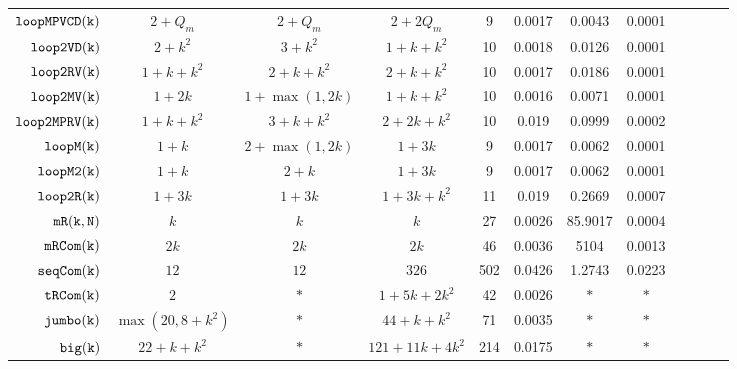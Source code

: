 {\begin {table}[t]
\begin{center}
{\begin{tabular}{| >{\tiny}r | c | c | c | c | c | c | c | c | c | c | c }
         $ {\mathtt{loopMPVCD(k)}}$ & $2+Q_m$ &  $2 + Q_m$  & $2+2Q_m$   &   9 & 0.0017 & 0.0043  & 0.0001 \\
         $  \mathtt{loop2VD(k)}$ & $2 + k^2$ &   $3 + k^2$ & $1 + k + k^2 $   &  10 & 0.0018 & 0.0126  & 0.0001  \\
         $  \mathtt{loop2RV(k)}$ & $1 + k +  k^2$ &  
         $ 2 + k +  k^2 $ 
         &  $2 + k + k^2$   &  10 & 0.0017 & 0.0186  & 0.0001  \\
         $  \mathtt{loop2MV(k)}$ & $1 + 2k $ & $1 + \max(1,2k) $ &  $1 + k + k^2 $  & 10 & 0.0016 & 0.0071  & 0.0001 \\
         $ \mathtt{loop2MPRV(k)}$ & $1 + k + k^2$ &  $3 + k + k^2  $ &  $2 + 2k + k^2  $  &  10 & 0.019 & 0.0999  & 0.0002 \\
         {$ \mathtt{loopM(k)}$} & $1 + k$ &  $ 2 + \max(1,2k) $ & $1 + 3k  $  &  9 & 0.0017 & 0.0062  & 0.0001  \\
         {$ \mathtt{loopM2(k)}$} & $1 + k$ &  $ 2 + k $ & $1 + 3k  $  &  9 & 0.0017 & 0.0062  & 0.0001  \\
         {$\mathtt{loop2R(k)}$} & $1 + 3k$ &  $1 + 3k $ &  $1 + 3k  + k^2$  &  11 & 0.019 & 0.2669  & 0.0007 \\
         $  \mathtt{mR(k, N)}$ & $k$ & $ k   $ & $k $   &  27 & 0.0026 & 85.9017  & 0.0004 \\
         $  \mathtt{mRCom(k)}$ & $2k$ & $  2k $ & $ 2k $   &  46 & 0.0036 & 5104  &  0.0013\\
         $  \mathtt{seqCom(k)}$ & $12$ & $12  $  & $326 $  &  502 & 0.0426  & 1.2743  & 0.0223 \\
         $  \mathtt{tRCom(k)}$ & $2$ &  $ * $ &  $ 1 + 5k + 2 k^2$  &  42 & 0.0026 & $*$  & $*$\\
         $  \mathtt{{jumbo(k)}}$ & $ \max(20, 8+k^2)$ &  $ * $   &   $ {44+k+k^2} $  &  71 & 0.0035 & $*$ &  $*$ \\
         $  {\mathtt{big(k)}} $ & $22+k+k^2$ &  $* $ &  $121+11k+4k^2 $  &  214 & 0.0175 & $*$ & $*$ \\
         \hline \hline
        \end{tabular}
}
\end{center}
\end{table}
}


